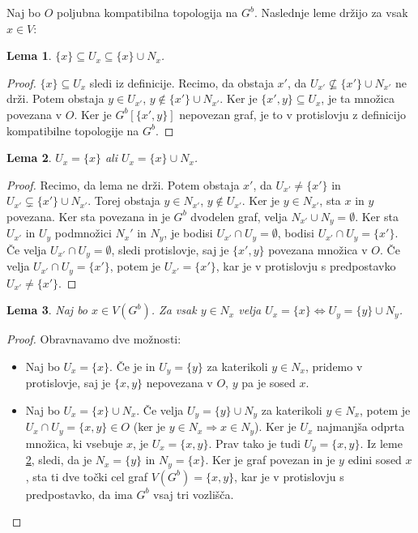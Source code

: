 \documentclass[a4paper, 12pt]{book}
\newtheorem{lemma}{Lema}[section]
\theoremstyle{definition}
\theoremstyle{remark}
\begin{document}
Naj bo $O$ poljubna kompatibilna topologija na $G^b$. Naslednje leme držijo za vsak $x \in V$:
\begin{lemma}\label{lem1}
  $\{x\} \subseteq U_x \subseteq \{x\} \cup N_x$.
\end{lemma}
\begin{proof}
  $\{x\} \subseteq U_x$ sledi iz definicije. Recimo, da obstaja $x'$, da
  $U_{x'} \nsubseteq \{x'\} \cup N_{x'}$ ne drži. Potem obstaja
  $y \in U_{x'}$, $y \notin \{x'\} \cup N_{x'}$. Ker je $\{x', y\} \subseteq U_x$,
  je ta množica povezana v $O$. Ker je $G^b[\{x',y\}]$ nepovezan graf, je to v
  protislovju z definicijo kompatibilne topologije na $G^b$.
\end{proof}
\begin{lemma}\label{lem2}
  $U_x = \{x\}$ ali $U_x = \{x\} \cup N_x$.
\end{lemma}
\begin{proof}
  Recimo, da lema ne drži. Potem obstaja $x'$, da $U_{x'} \neq \{x'\}$ in
  $U_{x'} \subsetneq \{x'\} \cup N_{x'}$. Torej obstaja $y \in N_{x'}$, $y \notin U_{x'}$.
  Ker je $y \in N_{x'}$, sta $x$ in $y$ povezana. Ker sta povezana in je $G^b$
  dvodelen graf, velja $N_{x'} \cup N_y = \emptyset$. Ker sta $U_{x'}$ in $U_y$ 
  podmnožici $N_x'$ in $N_y$, je bodisi $U_{x'} \cap U_y = \emptyset$,
  bodisi $U_{x'} \cap U_y = \{x'\}$. Če velja $U_{x'} \cap U_y = \emptyset$, sledi
  protislovje, saj je $\{x',y\}$ povezana množica v $O$.
  Če velja $U_{x'} \cap U_y = \{x'\}$, potem je $U_{x'} = \{x'\}$, kar je v
  protislovju s predpostavko $U_{x'} \neq \{x'\}$.
\end{proof}
\begin{lemma}\label{lem3}
  Naj bo $x \in V(G^b)$. Za vsak $y \in N_x$ velja $U_x = \{x\} \iff U_y = \{y\} \cup N_y$.
\end{lemma}
\begin{proof}
  Obravnavamo dve možnosti:
  \begin{itemize}
    \item[(1)] Naj bo $U_x = \{x\}$. Če je in $U_y = \{y\}$ za katerikoli $y \in N_x$, pridemo v protislovje, saj je 
    $\{x,y\}$ nepovezana v $O$, $y$ pa je sosed $x$.
    \item[(2)] Naj bo $U_x = \{x\} \cup N_x$. Če velja $U_y = \{y\} \cup N_y$ za katerikoli $y \in N_x$, potem je
    $U_x \cap U_y = \{x, y\} \in O$ (ker je $y \in N_x \Rightarrow x \in N_y$). Ker je
    $U_x$ najmanjša odprta množica, ki vsebuje $x$, je $U_x = \{x,y\}$. Prav tako je
    tudi $U_y = \{x,y\}$. Iz leme \ref*{lem2}, sledi, da je $N_x = \{y\}$ in $N_y = \{x\}$.
    Ker je graf povezan in je $y$ edini sosed $x$, sta ti dve točki cel graf
    $V(G^b) = \{x,y\}$, kar je v protislovju s predpostavko, da ima $G^b$ vsaj tri vozlišča.
  \end{itemize}
\end{proof}
\end{document}
